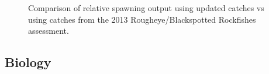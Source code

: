 \documentclass[
]{scrartcl}
\begin{document}
\begin{figure}[H]


\caption{\label{fig-Ct_compsRSS}Comparison of relative spawning output
using updated catches vs using catches from the 2013
Rougheye/Blackspotted Rockfishes assessment.}

\end{figure}%

\newpage

\subsection{Biology}\label{biology}
\end{document}
